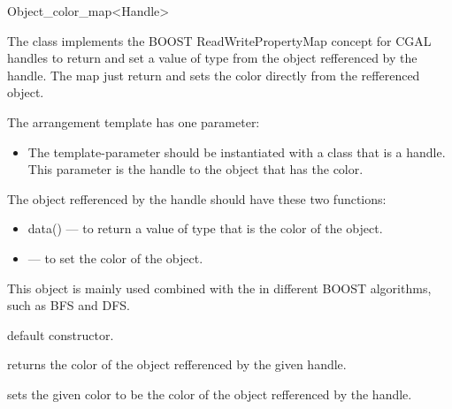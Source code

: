 
\ccRefPageBegin

\begin{ccRefClass}{Object_color_map<Handle>}
    
\ccDefinition

The class implements the BOOST ReadWritePropertyMap concept for CGAL handles 
to return and set a value of type  from the 
object refferenced by the handle. The map just return and sets the color 
directly from the refferenced object.

The arrangement template has one parameter:
\begin{itemize}
\item The  template-parameter should be instantiated with
a class that is a handle. This parameter is the handle to the object that has
the color.
\end{itemize}

The object refferenced by the handle should have these two functions:
\begin{itemize}
\item data() --- to return a value of type  that 
is the color of the object.
\item {} --- to set the color of the 
object.
\end{itemize}

This object is mainly used combined with the 
in different BOOST algorithms, such as BFS and DFS.


\ccCreation
{}
    
    {default constructor.}
    
\ccAccessFunctions

    {returns the color of the object refferenced by the given handle.}
    
\ccModifiers

   {sets the given color to be the color of the object refferenced by the 
handle.}
    
\ccSeeAlso

\end{ccRefClass}

\ccRefPageEnd
